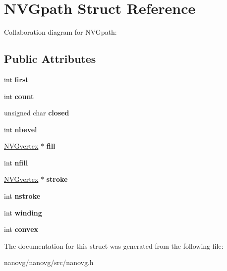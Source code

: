 \hypertarget{struct_n_v_gpath}{\section{N\+V\+Gpath Struct Reference}
\label{struct_n_v_gpath}
}


Collaboration diagram for N\+V\+Gpath\+:
\subsection*{Public Attributes}
\begin{DoxyCompactItemize}
\item 
\hypertarget{struct_n_v_gpath_a6f0776a67e3e60ab285a4e2686f5b45c}{int {\bfseries first}}\label{struct_n_v_gpath_a6f0776a67e3e60ab285a4e2686f5b45c}

\item 
\hypertarget{struct_n_v_gpath_a65bfb8db6e411e19a2dfc36336e5ed85}{int {\bfseries count}}\label{struct_n_v_gpath_a65bfb8db6e411e19a2dfc36336e5ed85}

\item 
\hypertarget{struct_n_v_gpath_a9951e19e1e502d56e5b16acaa9348f14}{unsigned char {\bfseries closed}}\label{struct_n_v_gpath_a9951e19e1e502d56e5b16acaa9348f14}

\item 
\hypertarget{struct_n_v_gpath_ac3e9a66a5132bfc42e19694c5548b2fb}{int {\bfseries nbevel}}\label{struct_n_v_gpath_ac3e9a66a5132bfc42e19694c5548b2fb}

\item 
\hypertarget{struct_n_v_gpath_aaa6d2203187f19f98311e9b4fa84a2ad}{\hyperlink{struct_n_v_gvertex}{N\+V\+Gvertex} $\ast$ {\bfseries fill}}\label{struct_n_v_gpath_aaa6d2203187f19f98311e9b4fa84a2ad}

\item 
\hypertarget{struct_n_v_gpath_a1301e4eaf5ae42646eb25295f9e1ccd8}{int {\bfseries nfill}}\label{struct_n_v_gpath_a1301e4eaf5ae42646eb25295f9e1ccd8}

\item 
\hypertarget{struct_n_v_gpath_a3aa8986801b4b48a87448f30ca2bc50b}{\hyperlink{struct_n_v_gvertex}{N\+V\+Gvertex} $\ast$ {\bfseries stroke}}\label{struct_n_v_gpath_a3aa8986801b4b48a87448f30ca2bc50b}

\item 
\hypertarget{struct_n_v_gpath_ab855f1ca7f88f871410a9c326fe4f207}{int {\bfseries nstroke}}\label{struct_n_v_gpath_ab855f1ca7f88f871410a9c326fe4f207}

\item 
\hypertarget{struct_n_v_gpath_aefa1aea3e295c4934fe89b5e1eb58e59}{int {\bfseries winding}}\label{struct_n_v_gpath_aefa1aea3e295c4934fe89b5e1eb58e59}

\item 
\hypertarget{struct_n_v_gpath_a85833dcd230251fdc7a3f75335c08e8f}{int {\bfseries convex}}\label{struct_n_v_gpath_a85833dcd230251fdc7a3f75335c08e8f}

\end{DoxyCompactItemize}


The documentation for this struct was generated from the following file\+:\begin{DoxyCompactItemize}
\item 
nanovg/nanovg/src/nanovg.\+h\end{DoxyCompactItemize}
